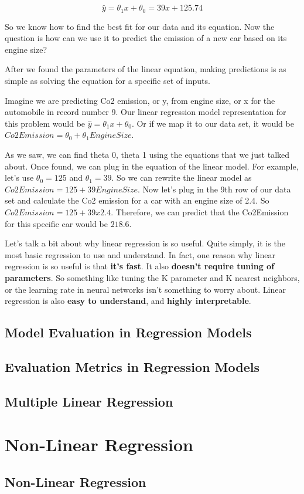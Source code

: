 	\begin{equation}
		\hat{y} = \theta_{1}x +\theta_{0}
				= 39x + 125.74
	\end{equation}
	
	So we know how to find the best fit for our data and its equation. Now the question is how can we use it to predict the emission of a new car based on its engine size?
	
	After we found the parameters of the linear equation, making predictions is as simple as solving the equation for a specific set of inputs.
	
	Imagine we are predicting Co2 emission, or y, from engine size, or x for the automobile in record number 9. Our linear regression model representation for this problem would be $\hat{y} = \theta_{1}x +\theta_{0}$. Or if we map it to our data set, it would be $Co2Emission =\theta_{0} + \theta_{1} EngineSize$.
	
	As we saw, we can find theta 0, theta 1 using the equations that we just talked about. Once found, we can plug in the equation of the linear model. For example, let's use $\theta_{0} = 125$ and $\theta_{1} = 39$. So we can rewrite the linear model as $Co2Emission = 125 + 39 EngineSize$. Now let's plug in the 9th row of our data set and calculate the Co2 emission for a car with an engine size of 2.4. So $Co2Emission = 125 + 39 x 2.4$. Therefore, we can predict that the Co2Emission for this specific car would be $218.6$. 
	
	Let's talk a bit about why linear regression is so useful. Quite simply, it is the most basic regression to use and understand. In fact, one reason why linear regression is so useful is that \textbf{it's fast}. It also \textbf{doesn't require tuning of parameters}. So something like tuning the K parameter and K nearest neighbors, or the learning rate in neural networks isn't something to worry about. Linear regression is also \textbf{easy to understand}, and \textbf{highly interpretable}.
	
	\subsection{Model Evaluation in Regression Models}
	
	
	
	\subsection{Evaluation Metrics in Regression Models}
	
	\subsection{Multiple Linear Regression}

\section{Non-Linear Regression}

	\subsection{Non-Linear Regression}